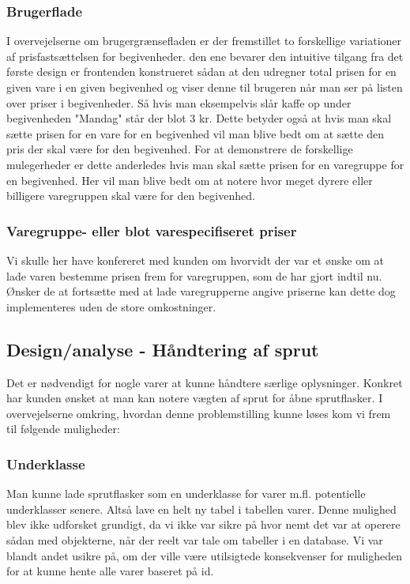 \documentclass[]{article}
\begin{document}
\subsubsection{Brugerflade}
I overvejelserne om brugergrænsefladen er der fremstillet to forskellige variationer af prisfastsættelsen for begivenheder. den ene bevarer den intuitive tilgang fra det første design er frontenden konstrueret sådan at den udregner total prisen for en given vare i en given begivenhed og viser denne til brugeren når man ser på listen over priser i begivenheder. Så hvis man eksempelvis slår kaffe op under begivenheden "Mandag" står der blot 3 kr. Dette betyder også at hvis man skal sætte prisen for en vare for en begivenhed vil man blive bedt om at sætte den pris der skal være for den begivenhed. For at demonstrere de forskellige mulegerheder er dette anderledes hvis man skal sætte prisen for en varegruppe for en begivenhed. Her vil man blive bedt om at notere hvor meget dyrere eller billigere varegruppen skal være for den begivenhed.  

\subsubsection{Varegruppe- eller blot varespecifiseret priser}
Vi skulle her have konfereret med kunden om hvorvidt der var et ønske om at lade varen bestemme prisen frem for varegruppen, som de har gjort indtil nu. Ønsker de at fortsætte med at lade varegrupperne angive priserne kan dette dog implementeres uden de store omkostninger.

\subsection{Design/analyse - Håndtering af sprut} \label{Sprut}

Det er nødvendigt for nogle varer at kunne håndtere særlige oplysninger. Konkret har kunden ønsket at man kan notere vægten af sprut for åbne sprutflasker. I overvejelserne omkring, hvordan denne problemstilling kunne løses kom vi frem til følgende muligheder:

\subsubsection{Underklasse}
Man kunne lade sprutflasker som en underklasse for varer m.fl. potentielle underklasser senere. Altså lave en helt ny tabel i tabellen varer. Denne mulighed blev ikke udforsket grundigt, da vi ikke var sikre på hvor nemt det var at operere sådan med objekterne, når der reelt var tale om tabeller i en database. Vi var blandt andet usikre på, om der ville være utilsigtede konsekvenser for muligheden for at kunne hente alle varer baseret på id.
\end{document}
